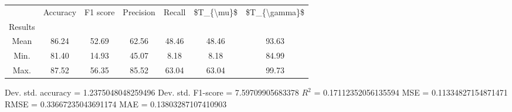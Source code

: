 \begin{tabular}{|c|c|c|c|c|c|c|}
\toprule
{} &  Accuracy &  F1 score &  Precision &  Recall &  \$T\_\{\textbackslash mu\}\$ &  \$T\_\{\textbackslash gamma\}\$ \\
Results &           &           &            &         &            &               \\
\hline
Mean    &     86.24 &     52.69 &      62.56 &   48.46 &      48.46 &         93.63 \\
Min.    &     81.40 &     14.93 &      45.07 &    8.18 &       8.18 &         84.99 \\
Max.    &     87.52 &     56.35 &      85.52 &   63.04 &      63.04 &         99.73 \\
\bottomrule
\end{tabular}

 Dev. std. accuracy = 1.2375048048259496
 Dev. std. F1-score = 7.59709905683378
 $R^2$ = 0.17112352056135594
 MSE = 0.11334827154871471
 RMSE = 0.33667235043691174
 MAE = 0.13803287107410903